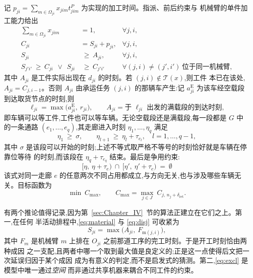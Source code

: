 \documentclass[manuscript,screen,review]{acmart}
\begin{document}
记 $p_{ji}=\sum_{m\in\Omega_{ji}}x_{jim}t^P_{jim}$ 为实现的加工时间。指派、前后约束与
机械臂的单件加工能力给出
\begin{align}
\sum_{m\in\Omega_{ji}} x_{jim} &= 1, & \forall j,i,
\label{eq:assign}\\
C_{ji} &= S_{ji}+p_{ji}, & \forall j,i,
\label{eq:dur}\\
S_{ji} &\ \ge\ A_{ji}, & \forall j,i,
\label{eq:material}\\
S_{j'i'}\ \ge\ C_{ji}\ \ \vee\ \ S_{ji} &\ \ge\ C_{j'i'}
& \forall (j,i)\neq(j',i')\ \text{位于同一机械臂},
\label{eq:disj}
\end{align}
其中 $A_{ji}$ 是工件实际出现在 $d_{ji}$ 的时刻。若 $(j,i)\notin\mathcal{T}(x)$,则工件
本已在该处,$A_{ji}=C_{j,i-1}$。否则 $A_{ji}$ 由承运任务 $(j,i)$ 的那辆车产生:记
$a^{\mathrm{E}}_{ji}$ 为该车经空载段到达取货节点的时刻,则
\begin{equation}
\label{eq:load}
\ell_{ji}=\max\bigl(a^{\mathrm{E}}_{ji},\ r_{ji}\bigr),
\qquad
A_{ji}=\text{于 } \ell_{ji} \text{ 出发的满载段的到达时刻},
\end{equation}
即车辆可以等工件,工件也可以等车辆。无论空载段还是满载段,每一段都是 $G$ 中的一条通路
$(e_1,\dots,e_q)$,其走廊进入时刻 $\eta_1,\dots,\eta_q$ 满足
\begin{equation}
\label{eq:walk}
\eta_1 \ \ge\ \sigma, \qquad
\eta_{l+1}\ \ge\ \eta_l+\tau_{e_l}, \quad l=1,\dots,q-1,
\end{equation}
其中 $\sigma$ 是该段可以开始的时刻;上述不等式取严格不等号的时刻恰好就是车辆在停靠位等待
的时刻,而该段在 $\eta_q+\tau_{e_q}$ 结束。最后是争用约束:
\begin{equation}
\label{eq:excl}
\bigl[\eta,\ \eta+\tau_e\bigr)\ \cap\
\bigl[\eta',\ \eta'+\tau_e\bigr)\ =\ \emptyset
\end{equation}
该式对同一走廊 $e$ 的任意两次不同占用都成立,与方向无关,也与涉及哪些车辆无关。目标函数为
\begin{equation}
\label{eq:obj}
\min\ C_{\max},\qquad
C_{\max}=\max_{j\in J}\ C_{j,\,n_j+\delta_{\mathrm{ret}}} .
\end{equation}

有两个推论值得记录,因为第~\ref{sec:Chapter_IV}~节的算法正建立在它们之上。第一,在任何
半活动排程中,\eqref{eq:material} 与 \eqref{eq:disj} 可收紧为
\begin{equation}
\label{eq:bind}
S_{ji}=\max\bigl(A_{ji},\ F_{\mathrm{m}(j,i)}\bigr),
\end{equation}
其中 $F_m$ 是机械臂 $m$ 上排在 $O_{ji}$ 之前那道工序的完工时刻。于是开工时刻恰由两种成因
之一支配,且两者中哪一个取到最大值是良定义的;正是这一点使得后文把一次延误归因于某个成因
成为有意义的判定,而不是启发式的猜测。第二,\eqref{eq:excl} 是模型中唯一通过\emph{空间}
而非通过共享机器来耦合不同工件的约束。
\end{document}
